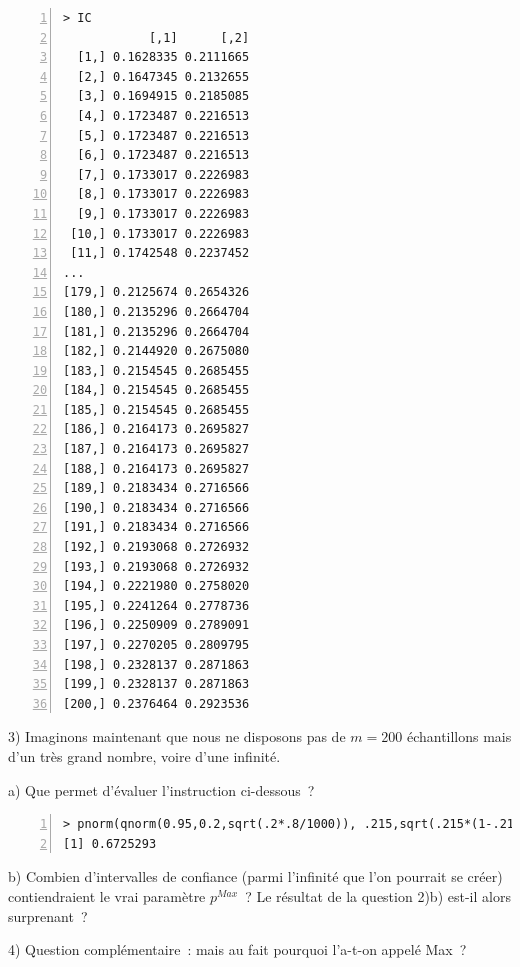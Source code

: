 \documentclass[10pt]{report}
\begin{document}
\begin{exercice}
\begin{Verbatim}[frame=leftline,fontfamily=tt,fontshape=n,numbers=left]
> IC 
            [,1]      [,2]
  [1,] 0.1628335 0.2111665
  [2,] 0.1647345 0.2132655
  [3,] 0.1694915 0.2185085
  [4,] 0.1723487 0.2216513
  [5,] 0.1723487 0.2216513
  [6,] 0.1723487 0.2216513
  [7,] 0.1733017 0.2226983
  [8,] 0.1733017 0.2226983
  [9,] 0.1733017 0.2226983
 [10,] 0.1733017 0.2226983
 [11,] 0.1742548 0.2237452
...
[179,] 0.2125674 0.2654326
[180,] 0.2135296 0.2664704
[181,] 0.2135296 0.2664704
[182,] 0.2144920 0.2675080
[183,] 0.2154545 0.2685455
[184,] 0.2154545 0.2685455
[185,] 0.2154545 0.2685455
[186,] 0.2164173 0.2695827
[187,] 0.2164173 0.2695827
[188,] 0.2164173 0.2695827
[189,] 0.2183434 0.2716566
[190,] 0.2183434 0.2716566
[191,] 0.2183434 0.2716566
[192,] 0.2193068 0.2726932
[193,] 0.2193068 0.2726932
[194,] 0.2221980 0.2758020
[195,] 0.2241264 0.2778736
[196,] 0.2250909 0.2789091
[197,] 0.2270205 0.2809795
[198,] 0.2328137 0.2871863
[199,] 0.2328137 0.2871863
[200,] 0.2376464 0.2923536
\end{Verbatim}




3) Imaginons maintenant que nous ne disposons pas de $m=200$ échantillons mais d'un très grand nombre, voire d'une infinité.

a)  
Que permet d'évaluer l'instruction ci-dessous~?

\begin{Verbatim}[frame=leftline,fontfamily=tt,fontshape=n,numbers=left]
> pnorm(qnorm(0.95,0.2,sqrt(.2*.8/1000)), .215,sqrt(.215*(1-.215)/1000))
[1] 0.6725293
\end{Verbatim}




b) 
Combien d'intervalles de confiance (parmi l'infinité que l'on pourrait se créer) contiendraient le vrai paramètre $p^{Max}$~? Le résultat de la question 2)b) est-il alors surprenant~?




4) Question complémentaire~: mais au fait pourquoi l'a-t-on appelé Max~?




\end{exercice}
\end{document}

